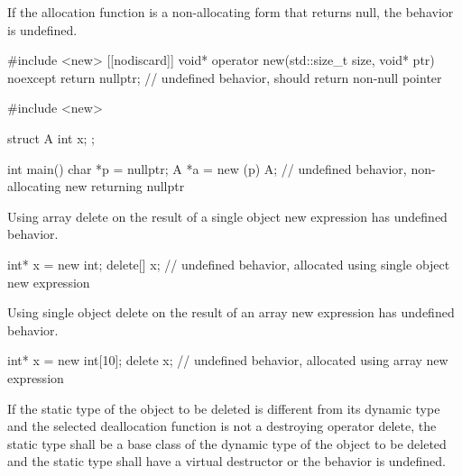 
\pnum
If the allocation function is a non-allocating form
that returns null, the behavior is undefined.

\pnum
\begin{example}
\begin{codeblock}
#include <new>
[[nodiscard]] void* operator new(std::size_t size, void* ptr) noexcept {
  return nullptr;       // undefined behavior, should return non-null pointer
}
\end{codeblock}
\end{example}
\begin{example}
\begin{codeblock}
#include <new>

struct A {
  int x;
};

int main() {
  char *p = nullptr;
  A *a = new (p) A;     // undefined behavior, non-allocating new returning nullptr
}
\end{codeblock}
\end{example}


\pnum
Using array delete on the result of a single object new expression
has undefined behavior.

\pnum
\begin{example}
\begin{codeblock}
int* x = new int;
delete[] x;         // undefined behavior, allocated using single object new expression
\end{codeblock}
\end{example}


\pnum
Using single object delete on the result of an array new expression has undefined behavior.

\pnum
\begin{example}
\begin{codeblock}
int* x = new int[10];
delete x;           // undefined behavior, allocated using array new expression
\end{codeblock}
\end{example}


\pnum
If the static type of the object to be deleted
is different from its dynamic type
and the selected deallocation function
is not a destroying operator delete,
the static type shall be a base class
of the dynamic type of the object to be deleted
and the static type shall have a virtual destructor
or the behavior is undefined.

